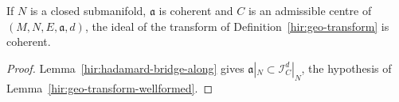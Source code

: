 \begin{corollary}
\label{hir:geo-transform-coherent}
\leanok
If \(N\) is a closed submanifold, \(\mathfrak a\) is coherent and \(C\) is an admissible centre of \((M,N,E,\mathfrak a,d)\), the ideal of the transform
of Definition~\ref{hir:geo-transform} is coherent.
\end{corollary}
\begin{proof}
\leanok
Lemma~\ref{hir:hadamard-bridge-along} gives \(\mathfrak a|_N\subset\mathcal I_C^d|_N\), the hypothesis of Lemma~\ref{hir:geo-transform-wellformed}.
\end{proof}